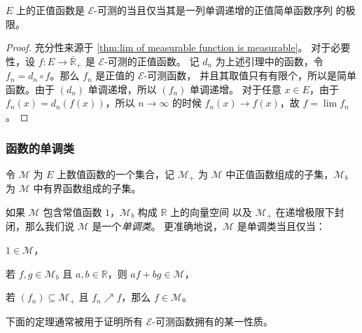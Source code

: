 \documentclass[fontset=none]{Notes}
\begin{document}
\begin{theorem}\label{thm:approximation of measurable function}
  $E$ 上的正值函数是 $\mathcal{E}$-可测的当且仅当其是一列单调递增的正值简单函数序列
  的极限。
\end{theorem}
\begin{proof}
  充分性来源于 \autoref{thm:lim of measurable function is measurable}。
  对于必要性，设 $f:E\to\bar{\mathbb{R}}_+$ 是 $\mathcal{E}$-可测的正值函数。
  记 $d_n$ 为上述引理中的函数，令 $f_n=d_n\circ f$。那么 $f_n$ 是正值的 $\mathcal{E}$-可测函数，
  并且其取值只有有限个，所以是简单函数。由于 $(d_n)$ 单调递增，所以 $(f_n)$ 单调递增。
  对于任意 $x\in E$，由于 $f_n(x)=d_n(f(x))$，所以 $n\to\infty$ 的时候
  $f_n(x)\to f(x)$，故 $f=\lim f_n$。
\end{proof}

\subsubsection{函数的单调类}

令 $\mathcal{M}$ 为 $E$ 上数值函数的一个集合，记 $\mathcal{M}_+$ 为 $\mathcal{M}$
中正值函数组成的子集，$\mathcal{M}_b$ 为 $\mathcal{M}$ 中有界函数组成的子集。

如果 $\mathcal{M}$ 包含常值函数 $1$，$\mathcal{M}_b$ 构成 $\mathbb{R}$ 上的向量空间
以及 $\mathcal{M}_+$ 在递增极限下封闭，那么我们说 $\mathcal{M}$ 是一个\emph{单调类}。
更准确地说，$\mathcal{M}$ 是单调类当且仅当：
\begin{alphenum}
  \item $1\in \mathcal{M}$，
  \item 若 $f,g\in \mathcal{M}_b$ 且 $a,b\in \mathbb{R}$，则 $af+bg\in \mathcal{M}$，
  \item 若 $(f_n)\subseteq \mathcal{M}_+$ 且 $f_n\nearrow f$，那么
  $f\in \mathcal{M}$。
\end{alphenum}

下面的定理通常被用于证明所有 $\mathcal{E}$-可测函数拥有的某一性质。
\end{document}
